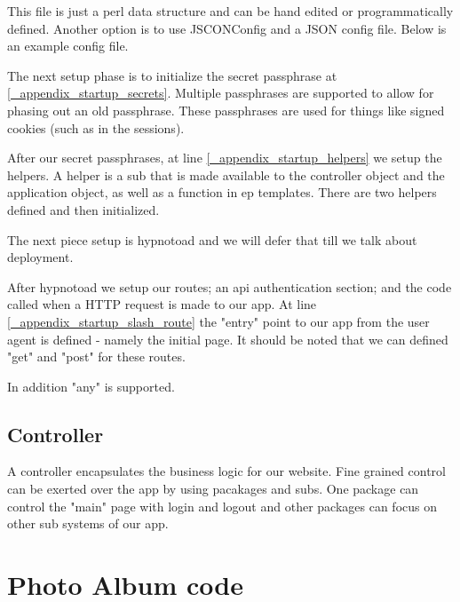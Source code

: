 \documentclass[16pt,pdftex]{book}
\begin{document}
This file is just a perl data structure and can be hand edited or
programmatically defined.  Another option is to use JSCONConfig and a JSON
config file.  Below is an example config file.



The next setup phase is to initialize the secret passphrase at
\ref{_appendix_startup_secrets}.  Multiple passphrases are supported to allow
for phasing out an old passphrase.  These passphrases are used for things like
signed cookies (such as in the sessions).

After our secret passphrases, at line \ref{_appendix_startup_helpers} we setup
the helpers.  A helper is a sub that is made available to the controller object
and the application object, as well as a function in ep templates.  There are
two helpers defined and then initialized.

The next piece setup is hypnotoad and we will defer that till we talk about deployment.

After hypnotoad we setup our routes; an api authentication section; and the
code called when a HTTP request is made to our app.  At line
\ref{_appendix_startup_slash_route} the "entry" point to our app from the user
agent is defined - namely the initial page.  It should be noted that we can
defined "get" and "post" for these routes.  

In addition "any" is supported.

\subsection{Controller}

A controller encapsulates the business logic for our website.  Fine grained
control can be exerted over the app by using pacakages and subs.  One package
can control the "main" page with login and logout and other packages can focus
on other sub systems of our app.

\appendix
\section{Photo Album code}

% 








\end{document}
